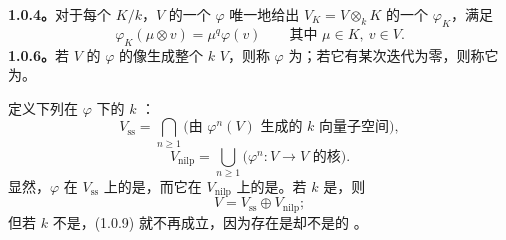 \textbf{1.0.4。}对于每个 $K/k$，$V$ 的一个  $\varphi$ 唯一地给出 $V_K=V\otimes_k K$ 的一个  $\varphi_K$，满足
\[
\varphi_K(\mu\otimes v)=\mu^q\varphi(v)
\qquad\text{其中 }\mu\in K,\ v\in V. \tag{1.0.5}
\]
\textbf{1.0.6。}若 $V$ 的  $\varphi$ 的像生成整个 $k$  $V$，则称 $\varphi$ 为；若它有某次迭代为零，则称它为。

定义下列在 $\varphi$ 下的 $k$ ：
\[
V_{\mathrm{ss}}=\bigcap_{n\geq1}
\bigl(\text{由 }\varphi^n(V)\text{ 生成的 }k\text{ 向量子空间}\bigr), \tag{1.0.7}
\]
\[
V_{\mathrm{nilp}}=\bigcup_{n\geq1}
\bigl(\varphi^n:V\longrightarrow V\text{ 的核}\bigr). \tag{1.0.8}
\]
显然，$\varphi$ 在 $V_{\mathrm{ss}}$ 上的是，而它在 $V_{\mathrm{nilp}}$ 上的是。若 $k$ 是，则
\[
V=V_{\mathrm{ss}}\oplus V_{\mathrm{nilp}}; \tag{1.0.9}
\]
但若 $k$ 不是，(1.0.9) 就不再成立，因为存在是却不是的 。

